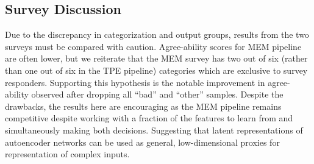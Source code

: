 \documentclass[runningheads,a4paper]{llncs}
\begin{document}
\subsection{Survey Discussion}
\label{survey2_takeaway}
Due to the discrepancy in categorization and output groups, results from the two surveys must be compared with caution. Agree-ability scores for MEM pipeline are often lower, but we reiterate that the MEM survey has two out of six (rather than one out of six in the TPE pipeline) categories which are exclusive to survey responders. Supporting this hypothesis is the notable improvement in agree-ability observed after dropping all \enquote{bad} and \enquote{other} samples. Despite the drawbacks, the results here are encouraging as the MEM pipeline remains competitive despite working with a fraction of the features to learn from and simultaneously making both decisions. Suggesting that latent representations of autoencoder networks can be used as general, low-dimensional proxies for representation of complex inputs.  




\end{document}
